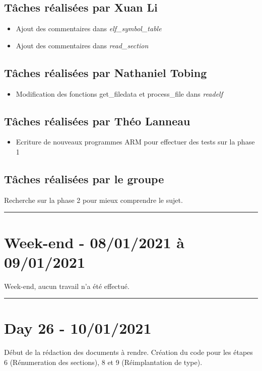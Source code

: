 \documentclass[11pt,letterpaper]{article}
\begin{document}
\subsection*{Tâches réalisées par Xuan Li}
\begin{itemize}
    \item Ajout des commentaires dans \textit{elf\_symbol\_table}
    \item Ajout des commentaires dans \textit{read\_section}
\end{itemize}

\subsection*{Tâches réalisées par Nathaniel Tobing}
\begin{itemize}
    \item Modification des fonctions get\_filedata et process\_file dans \textit{readelf}
\end{itemize}

\subsection*{Tâches réalisées par Théo Lanneau}
\begin{itemize}
    \item Ecriture de nouveaux programmes ARM pour effectuer des tests sur la phase 1
\end{itemize}

\subsection*{Tâches réalisées par le groupe}
Recherche sur la phase 2 pour mieux comprendre le sujet.

\noindent\rule{13cm}{0.4pt}

\section*{Week-end - 08/01/2021 à 09/01/2021}

Week-end, aucun travail n'a été effectué.

\noindent\rule{13cm}{0.4pt}

\section*{Day 26 - 10/01/2021}
Début de la rédaction des documents à rendre.
Création du code pour les étapes 6 (Rénumeration des sections), 8 et 9 
(Réimplantation de type).
\end{document}
